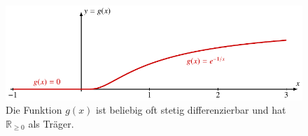 %
%
%
\begin{figure}
\centering
\includegraphics{chapters/030-kurvenintegral/images/e1x.pdf}
\caption{Die Funktion $g(x)$ ist beliebig oft stetig differenzierbar
und hat $\mathbb{R}_{\ge 0}$ als Träger.
\label{buch:kurvenintegral:fig:e1x}}
\end{figure}
